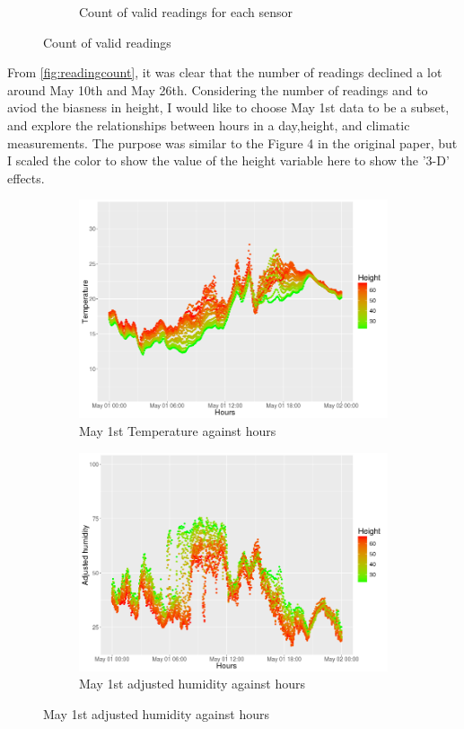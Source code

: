 \documentclass[11pt]{article}
\begin{document}
{\begin{figure}[H]
\begin{subfigure}{.5\textwidth}
\caption{Count of valid readings for each sensor}
\label{fig:heightcount}
\end{subfigure}
\caption{Count of valid readings}
\end{figure}%
From \ref{fig:readingcount}, it was clear that the number of readings declined a lot around May 10th and May 26th. Considering the number of readings and to aviod the biasness in height, I would like to choose May 1st data to be a subset, and explore the relationships between hours in a day,height, and climatic measurements. The purpose was similar to the Figure 4 in the original paper, but I scaled the color to show the value of the height variable here to show the '3-D' effects.
\begin{figure}[H]
\centering
\begin{subfigure}{.5\textwidth}
\centering
\includegraphics[width=0.88\linewidth,height=0.5\linewidth]{51_temp.png}
\caption{May 1st Temperature against hours}
\label{fig:51temp}
\end{subfigure}%
\begin{subfigure}{.5\textwidth}
\centering
\includegraphics[width=0.88\linewidth,height=0.5\linewidth]{51_humid.png}
\caption{May 1st adjusted humidity against hours}
\label{fig:51humid}
\end{subfigure}

\end{figure}}
\end{document}
